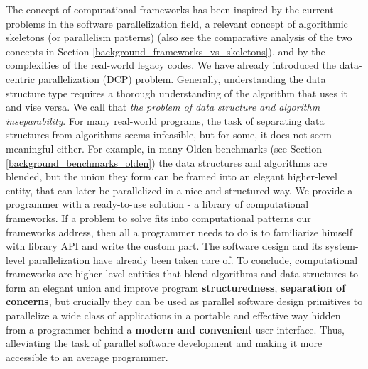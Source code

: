 \quad The concept of computational frameworks has been inspired by the current problems in the software parallelization field, a relevant concept of algorithmic skeletons (or parallelism patterns) (also see the comparative analysis of the two concepts in Section \ref{background_frameworks_vs_skeletons}), and by the complexities of the real-world legacy codes. We have already introduced the data-centric parallelization (DCP) problem. Generally, understanding the data structure type requires a thorough understanding of the algorithm that uses it and vise versa. We call that \textit{the problem of data structure and algorithm inseparability}. For many real-world programs, the task of separating data structures from algorithms seems infeasible, but for some, it does not seem meaningful either. For example, in many Olden benchmarks (see Section \ref{background_benchmarks_olden}) the data structures and algorithms are blended, but the union they form can be framed into an elegant higher-level entity, that can later be parallelized in a nice and structured way. We provide a programmer with a ready-to-use solution - a library of computational frameworks. If a problem to solve fits into computational patterns our frameworks address, then all a programmer needs to do is to familiarize himself with library API and write the custom part. The software design and its system-level parallelization have already been taken care of.\newline\null
\quad To conclude, computational frameworks are higher-level entities that blend algorithms and data structures to form an elegant union and improve program \textbf{structuredness}, \textbf{separation of concerns}, but crucially they can be used as parallel software design primitives to parallelize a wide class of applications in a portable and effective way hidden from a programmer behind a \textbf{modern and convenient} user interface. Thus, alleviating the task of parallel software development and making it more accessible to an average programmer.

